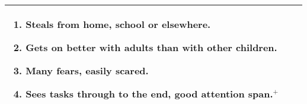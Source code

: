 \begin{table}[ht!]
\begin{tabular}{L{.46\linewidth}L{.001\linewidth}L{.46\linewidth}}
\begin{enumerate}
\item Steals from home, school or elsewhere.
\item Gets on better with adults than with other children.
\item Many fears, easily scared.
\item Sees tasks through to the end, good attention span.$^+$
\end{enumerate}
\\
\bottomrule
\end{tabular}
\end{table}

